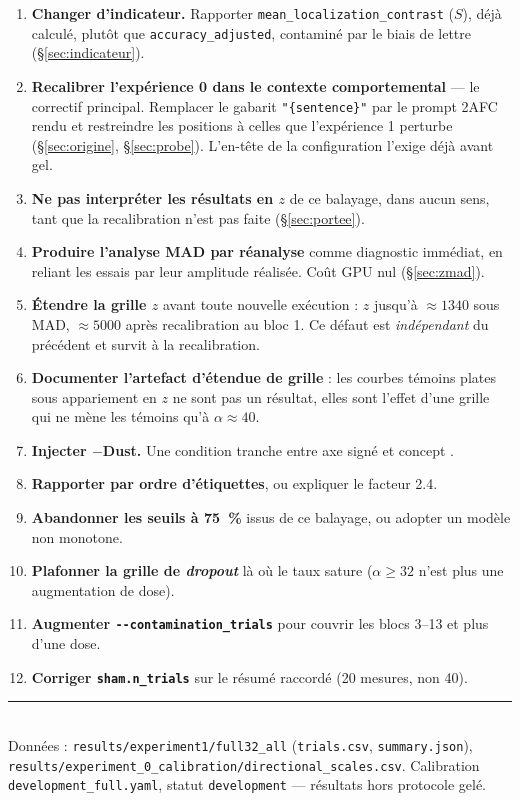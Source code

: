 \documentclass[11pt,a4paper]{article}
\newcommand{\code}[1]{\texttt{\small #1}}
\begin{document}
\begin{enumerate}
\item \textbf{Changer d'indicateur.} Rapporter \code{mean\_localization\_contrast} ($S$),
      déjà calculé, plutôt que \code{accuracy\_adjusted}, contaminé par le biais de
      lettre (\S\ref{sec:indicateur}).
\item \textbf{Recalibrer l'expérience 0 dans le contexte comportemental} --- le correctif
      principal. Remplacer le gabarit \code{"\{sentence\}"} par le prompt 2AFC rendu et
      restreindre les positions à celles que l'expérience 1 perturbe
      (\S\ref{sec:origine}, \S\ref{sec:probe}). L'en-tête de la configuration l'exige
      déjà avant gel.
\item \textbf{Ne pas interpréter les résultats en $z$} de ce balayage, dans aucun sens,
      tant que la recalibration n'est pas faite (\S\ref{sec:portee}).
\item \textbf{Produire l'analyse MAD par réanalyse} comme diagnostic immédiat, en
      reliant les essais par leur amplitude réalisée. Coût GPU nul (\S\ref{sec:zmad}).
\item \textbf{Étendre la grille $z$} avant toute nouvelle exécution : $z$ jusqu'à
      $\approx 1340$ sous MAD, $\approx 5000$ après recalibration au bloc 1. Ce défaut
      est \emph{indépendant} du précédent et survit à la recalibration.
\item \textbf{Documenter l'artefact d'étendue de grille} : les courbes témoins plates
      sous appariement en $z$ ne sont pas un résultat, elles sont l'effet d'une grille qui
      ne mène les témoins qu'à $\alpha \approx 40$.
\item \textbf{Injecter $-$Dust.} Une condition tranche entre \og axe signé \fg{} et
      \og concept \fg.
\item \textbf{Rapporter par ordre d'étiquettes}, ou expliquer le facteur \num{2.4}.
\item \textbf{Abandonner les seuils à \SI{75}{\percent}} issus de ce balayage, ou adopter
      un modèle non monotone.
\item \textbf{Plafonner la grille de \emph{dropout}} là où le taux sature
      ($\alpha \geq 32$ n'est plus une augmentation de dose).
\item \textbf{Augmenter \code{-{}-contamination\_trials}} pour couvrir les blocs 3--13 et
      plus d'une dose.
\item \textbf{Corriger \code{sham.n\_trials}} sur le résumé raccordé (\num{20} mesures,
      non \num{40}).
\end{enumerate}

\vspace{1em}
\noindent\rule{\textwidth}{0.4pt}\\
\footnotesize
Données : \code{results/experiment1/full32\_all} (\code{trials.csv}, \code{summary.json}),
\code{results/experiment\_0\_calibration/directional\_scales.csv}. Calibration
\code{development\_full.yaml}, statut \code{development} --- résultats hors protocole gelé.
\end{document}
